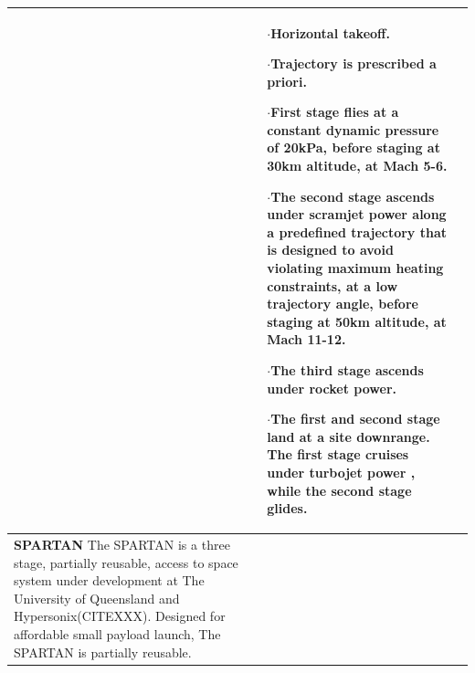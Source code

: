 {\begin{landscape}
\begin{xltabular}{\linewidth}{|X|X|X|}
	
	&\small
	$\cdot$Horizontal takeoff. 
	
	$\cdot$Trajectory is prescribed a priori.
	
	$\cdot$First stage flies at a constant dynamic pressure of 20kPa, before staging at 30km altitude, at Mach 5-6.
	
	$\cdot$The second stage ascends under scramjet power along a predefined trajectory that is designed to avoid violating maximum heating constraints, at a low trajectory angle, before staging at 50km altitude, at Mach 11-12.
	
	$\cdot$The third stage ascends under rocket power. 
	
	$\cdot$The first and second stage land at a site downrange. The first stage cruises under turbojet power , while the second stage glides. 
	

	\\
	\hline \small
	\textbf{SPARTAN}\cite{Preller2018a} \newline\newline
	The SPARTAN is a three stage, partially reusable, access to space system under development at The University of Queensland\cite{Jazra2013,Preller2018a} and Hypersonix(CITEXXX). Designed for affordable small payload launch, The SPARTAN is partially reusable. 
	&\small
	

\end{xltabular}
\end{landscape}}
